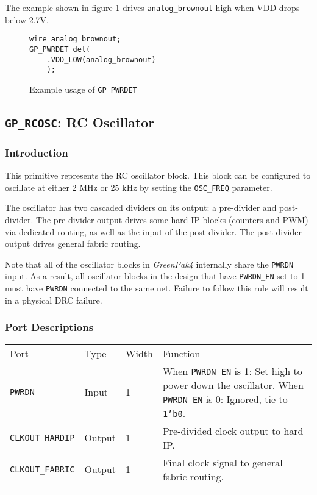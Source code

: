 \documentclass[11pt]{article}
\newcommand{\namestyle}[1]{\textit{#1}}
\newcommand{\tokenstyle}[1]{\texttt{#1}}
\newcommand{\datastyle}[1]{\texttt{#1}}
\newcommand{\whenstyle}[1]{{\fontseries{sb}\selectfont#1}}
\newcommand{\thinhline}{\Xhline{1\arrayrulewidth}}
\newcommand{\thickhline}{\Xhline{2.5\arrayrulewidth}}
\begin{document}
The example shown in figure \ref{gp-pwrdet-example} drives \tokenstyle{analog\_brownout} high when VDD drops below 2.7V.

\begin{figure}[h]
\begin{lstlisting}
wire analog_brownout;
GP_PWRDET det(
	.VDD_LOW(analog_brownout)
	);
\end{lstlisting}
\caption{Example usage of \tokenstyle{GP\_PWRDET}}
\label{gp-pwrdet-example}
\end{figure}


\pagebreak
\subsection{\tokenstyle{GP\_RCOSC}: RC Oscillator}
\label{gp-rcosc}

\subsubsection{Introduction}
This primitive represents the RC oscillator block. This block can be configured to oscillate at either 2 MHz or 25 kHz
by setting the \tokenstyle{OSC\_FREQ} parameter.

The oscillator has two cascaded dividers on its output: a pre-divider and post-divider. The pre-divider output drives
some hard IP blocks (counters and PWM) via dedicated routing, as well as the input of the post-divider. The
post-divider output drives general fabric routing.

Note that all of the oscillator blocks in \namestyle{GreenPak4} internally share the \tokenstyle{PWRDN} input. As a result, all oscillator blocks in the design that have \tokenstyle{PWRDN\_EN} set to 1 must have \tokenstyle{PWRDN} connected to the same net. Failure to follow this rule will result in a physical DRC failure.

\subsubsection{Port Descriptions}

\begin{tabularx}{\textwidth}{lllX}
\thinhline
\whenstyle{Port} & \whenstyle{Type} & \whenstyle{Width} & \whenstyle{Function} \\
\thickhline
\tokenstyle{PWRDN} & Input & 1 &
	\whenstyle{When \tokenstyle{PWRDN\_EN} is 1:} Set high to power down the oscillator. \newline
	\whenstyle{When \tokenstyle{PWRDN\_EN} is 0:} Ignored, tie to \datastyle{1'b0}.\\
\thinhline
\tokenstyle{CLKOUT\_HARDIP} & Output & 1 & Pre-divided clock output to hard IP. \\
\thinhline
\tokenstyle{CLKOUT\_FABRIC} & Output & 1 & Final clock signal to general fabric routing. \\
\thinhline
\end{tabularx}
\end{document}
